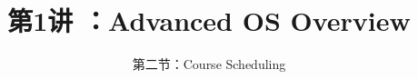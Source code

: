 


\title[第1讲]{第1讲 ：Advanced OS Overview} %
\subtitle{第二节：Course Scheduling}

\date{}



\begin{frame}
\titlepage %
\end{frame}

